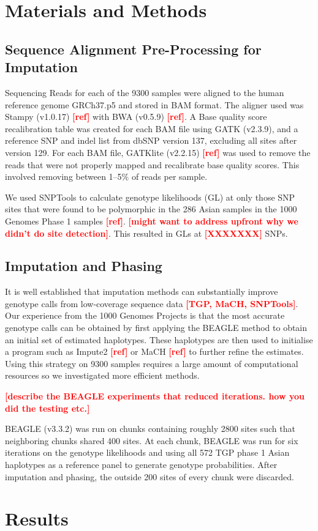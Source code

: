 \documentclass[draft,a4paper]{tufte-handout}
\newcommand{\red}[1]{\textsf{\textbf{\textcolor{red}{[#1]}}}}
\begin{document}


\section{Materials and Methods}
\subsection{Sequence Alignment Pre-Processing for Imputation}

Sequencing Reads for each of the 9300 samples were aligned to the
human reference genome GRCh37.p5 and stored in BAM format. 
The aligner used was Stampy (v1.0.17) \red{ref} with
BWA (v0.5.9) \red{ref}. 
A Base quality score recalibration table was created for each BAM file
using GATK (v2.3.9), and a
reference SNP and indel list from dbSNP version 137, excluding all
  sites after version 129. 
For each BAM file, GATKlite (v2.2.15) \red{ref} was used to remove the reads that were not
properly mapped and recalibrate base quality scores. This involved removing between 1--5$\%$ of reads per sample.

We used SNPTools to calculate genotype likelihoods (GL) at only those
SNP sites that were found to be polymorphic in the 286 Asian samples
in the 1000 Genomes Phase 1 samples \red{ref}. \red{might want to
  address upfront why we didn't do site detection}. This resulted in
GLs at \red{XXXXXXX} SNPs. 

\subsection{Imputation and Phasing}

It is well established that imputation methods can substantially improve genotype calls from low-coverage sequence data \red{TGP, MaCH, SNPTools}. 
Our experience from the 1000 Genomes Projects is that the most
accurate genotype calls can be obtained by first applying the BEAGLE
method to obtain an initial set of estimated haplotypes. These
haplotypes are then used to initialise a program such as Impute2
\red{ref} or MaCH \red{ref} to further refine the estimates. Using
this strategy on 9300 samples requires a large amount of
computational resources so we investigated more efficient methods.  

\red{describe the BEAGLE experiments that reduced iterations. how you did the testing etc.}

BEAGLE (v3.3.2) was run on chunks containing roughly 2800 sites such
that neighboring chunks shared 400 sites. 
At each chunk, BEAGLE was run for six
iterations on the genotype likelihoods and using all 572 TGP phase 1
Asian haplotypes as a reference panel to generate genotype
probabilities.  
After imputation and phasing, the outside 200 sites of every chunk
were discarded.

\section{Results}







\end{document}
